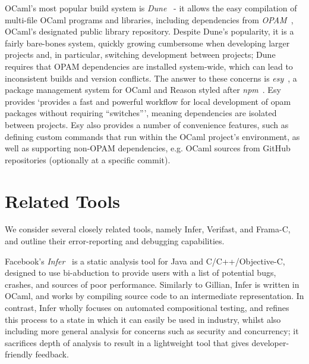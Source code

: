 OCaml's most popular build system is \textit{Dune}~\cite{dune} - it allows the
easy compilation of multi-file OCaml programs and libraries, including
dependencies from \textit{OPAM}~\cite{opam}, OCaml's designated public library
repository. Despite Dune's popularity, it is a fairly bare-bones system, quickly
growing cumbersome when developing larger projects and, in particular,
switching development between projects; Dune requires that OPAM dependencies
are installed system-wide, which can lead to inconsistent builds and version
conflicts. The answer to these concerns is \textit{esy}~\cite{esy}, a package
management system for OCaml and Reason styled after \textit{npm}~\cite{npm}.
Esy provides `provides a fast and powerful workflow for local development of
opam packages without requiring ``switches''', meaning dependencies are isolated
between projects. Esy also provides a number of convenience features, such as
defining custom commands that run within the OCaml project's environment, as
well as supporting non-OPAM dependencies, e.g. OCaml sources from GitHub
repositories (optionally at a specific commit).



\section{Related Tools}
\label{sec:background:related-work}

We consider several closely related tools, namely Infer, Verifast, and Frama-C, and outline their error-reporting and debugging capabilities.

Facebook's \textit{Infer}~\cite{infer, infer-site} is a static analysis tool
for Java and C/C++/Objective-C, designed to use bi-abduction to provide users
with a list of potential bugs, crashes, and sources of poor performance.
Similarly to Gillian, Infer is written in OCaml, and works by compiling source
code to an intermediate representation. In contrast, Infer wholly focuses on
automated compositional testing, and refines this process to a state in which
it can easily be used in industry, whilst also including more general analysis
for concerns such as security and concurrency; it sacrifices depth of analysis
to result in a lightweight tool that gives developer-friendly feedback.

